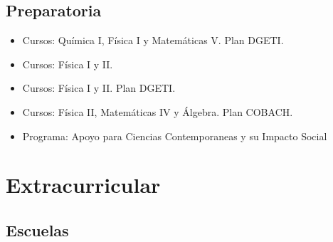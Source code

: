\documentclass[11pt,a4paper,sans]{moderncv}      %
\begin{document}
\subsection{Preparatoria}

\vspace{6pt}

\begin{itemize}

\item{ {Cursos:
Qu\'imica I, F\'isica I y Matem\'aticas V. Plan
DGETI.}{}{}}\vspace{3pt}

\item{ {Cursos:
F\'isica I y II.}{}{}}\vspace{3pt}

\item{ {}{Cursos:
F\'isica I y II. Plan DGETI.}{}{}}\vspace{3pt}


\item{ {}{Cursos:
F\'isica II, Matem\'aticas IV y \'Algebra. Plan
COBACH.}{}{}}\vspace{3pt}


\item{ {}{Programa: Apoyo para Ciencias
Contemporaneas y su Impacto Social}{}}\vspace{3pt}

\end{itemize}



\section{Extracurricular}

\subsection{Escuelas}


\vspace{5pt}
\end{document}
